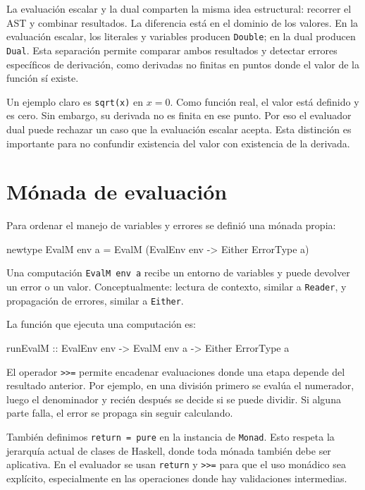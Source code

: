 \documentclass[11pt,a4paper]{article}
\newenvironment{lstlisting}{\verbatim}{\endverbatim}
\begin{document}
La evaluación escalar y la dual comparten la misma idea estructural: recorrer el AST y combinar resultados. La diferencia está en el dominio de los valores. En la evaluación escalar, los literales y variables producen \texttt{Double}; en la dual producen \texttt{Dual}. Esta separación permite comparar ambos resultados y detectar errores específicos de derivación, como derivadas no finitas en puntos donde el valor de la función sí existe.

Un ejemplo claro es \texttt{sqrt(x)} en \(x = 0\). Como función real, el valor está definido y es cero. Sin embargo, su derivada no es finita en ese punto. Por eso el evaluador dual puede rechazar un caso que la evaluación escalar acepta. Esta distinción es importante para no confundir existencia del valor con existencia de la derivada.

\section{Mónada de evaluación}

Para ordenar el manejo de variables y errores se definió una mónada propia:

\begin{lstlisting}
newtype EvalM env a =
  EvalM (EvalEnv env -> Either ErrorType a)
\end{lstlisting}

Una computación \texttt{EvalM env a} recibe un entorno de variables y puede devolver un error o un valor. Conceptualmente: lectura de contexto, similar a \texttt{Reader}, y propagación de errores, similar a \texttt{Either}.

La función que ejecuta una computación es:

\begin{lstlisting}
runEvalM :: EvalEnv env -> EvalM env a -> Either ErrorType a
\end{lstlisting}

El operador \texttt{>>=} permite encadenar evaluaciones donde una etapa depende del resultado anterior. Por ejemplo, en una división primero se evalúa el numerador, luego el denominador y recién después se decide si se puede dividir. Si alguna parte falla, el error se propaga sin seguir calculando.

También definimos \texttt{return = pure} en la instancia de \texttt{Monad}. Esto respeta la jerarquía actual de clases de Haskell, donde toda mónada también debe ser aplicativa. En el evaluador se usan \texttt{return} y \texttt{>>=} para que el uso monádico sea explícito, especialmente en las operaciones donde hay validaciones intermedias.
\end{document}
